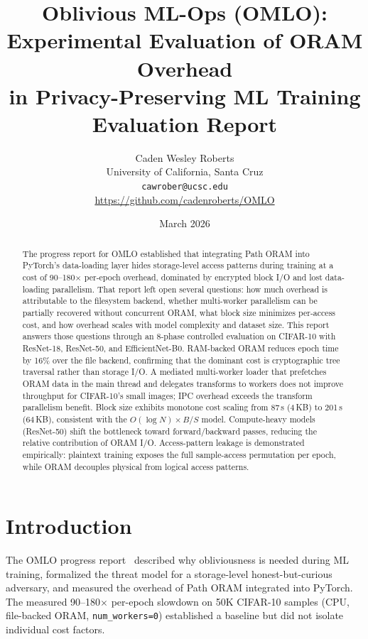 \documentclass[11pt]{article}
\title{\textbf{Oblivious ML-Ops (OMLO): Experimental Evaluation of ORAM Overhead\\in Privacy-Preserving ML Training} \\ \vspace{0.3em} \large Evaluation Report}
\author{Caden Wesley Roberts \\ University of California, Santa Cruz \\ \texttt{cawrober@ucsc.edu} \\ \url{https://github.com/cadenroberts/OMLO}}
\date{March 2026}
\begin{document}
\maketitle

\begin{abstract}
The progress report for OMLO established that integrating Path ORAM into PyTorch's data-loading layer hides storage-level access patterns during training at a cost of 90--180$\times$ per-epoch overhead, dominated by encrypted block I/O and lost data-loading parallelism.
That report left open several questions: how much overhead is attributable to the filesystem backend, whether multi-worker parallelism can be partially recovered without concurrent ORAM, what block size minimizes per-access cost, and how overhead scales with model complexity and dataset size.
This report answers those questions through an 8-phase controlled evaluation on CIFAR-10 with ResNet-18, ResNet-50, and EfficientNet-B0.
RAM-backed ORAM reduces epoch time by 16\% over the file backend, confirming that the dominant cost is cryptographic tree traversal rather than storage I/O.
A mediated multi-worker loader that prefetches ORAM data in the main thread and delegates transforms to workers does not improve throughput for CIFAR-10's small images; IPC overhead exceeds the transform parallelism benefit.
Block size exhibits monotone cost scaling from 87\,s (4\,KB) to 201\,s (64\,KB), consistent with the $O(\log N) \times B/S$ model.
Compute-heavy models (ResNet-50) shift the bottleneck toward forward/backward passes, reducing the relative contribution of ORAM I/O.
Access-pattern leakage is demonstrated empirically: plaintext training exposes the full sample-access permutation per epoch, while ORAM decouples physical from logical access patterns.
\end{abstract}

\section{Introduction}

The OMLO progress report~\cite{mid} described why obliviousness is needed during ML training, formalized the threat model for a storage-level honest-but-curious adversary, and measured the overhead of Path ORAM integrated into PyTorch.
The measured 90--180$\times$ per-epoch slowdown on 50K CIFAR-10 samples (CPU, file-backed ORAM, \texttt{num\_workers=0}) established a baseline but did not isolate individual cost factors.
\end{document}

